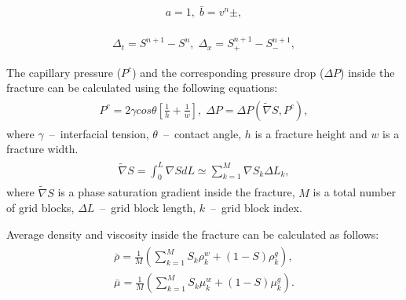 \documentclass[a4paper,12pt]{extreport}
\begin{document}
\begin{eqnarray}
\label{eq:twophase_a_b_coeffs_free}
\begin{gathered}
a = 1, \; \bar{b} = v^n\pm,
\end{gathered}
\end{eqnarray}

\begin{eqnarray}
\label{eq:twophase_delta_num}
\Delta_t = S^{n+\mathit{1}} - S^{n}, \; \Delta_x = S_{+}^{n+\mathit{1}} - S_{-}^{n+\mathit{1}},
\end{eqnarray}
 
 The capillary pressure ($P^c$)  and the corresponding pressure drop ($\Delta P$) inside the fracture can be calculated using the following equations:
  \begin{eqnarray}
  \begin{gathered}
  \label{eq:twophase_capillary_pressure_fractures}
  P^{c} = 2 \gamma cos \theta \left[\frac{1}{h} + \frac{1}{w}\right], \; \Delta P = \Delta P \left(\tilde{\nabla} S, P^c\right),
  \end{gathered}
  \end{eqnarray}
  where $\gamma$~--~interfacial tension, $\theta$~--~contact angle, $h$ is a fracture height and $w$ is a fracture width.
  \begin{eqnarray}
  \label{eq:twophase_av_saturation_grad}
  \begin{gathered}
  \tilde{\nabla} S = \int_{0}^{L} \nabla S dL \simeq\sum_{k=1}^{M} \nabla S_{k} \Delta L_{k},
  \end{gathered}
  \end{eqnarray}
 where $\tilde{\nabla} S$ is a phase saturation gradient inside the fracture, $M$ is a total number of grid blocks, $\Delta L$~--~grid block length, $k$~--~grid block index.
 
 
Average density and viscosity inside the fracture can be calculated as follows:
  \begin{eqnarray}
  \label{eq:twophase_dens_visc}
  \begin{gathered}
  \bar{\rho} = \frac{1}{M}\left(\sum_{k=1}^M S_{k} \rho_k^w+ \left(1-S\right) \rho_k^g\right), \\
  \bar{\mu} = \frac{1}{M}\left(\sum_{k=1}^M S_{k} \mu_k^w+ \left(1-S\right) \mu_k^g\right).
  \end{gathered}
  \end{eqnarray}
\end{document}
